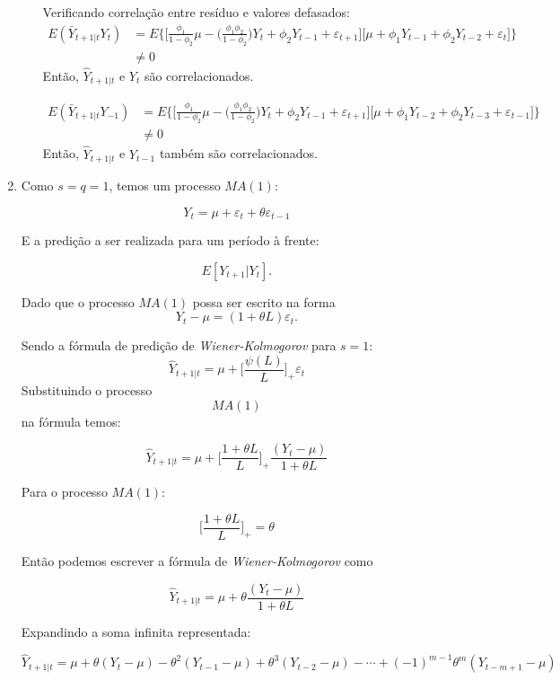 \begin{enumerate}
\begin{enumerate}
	Verificando correlação entre resíduo e valores defasados: \begin{align*}
			E(\bar{Y}_{t+1|t}Y_t)&=E\Bigg\{\Bigg[\frac{\phi_1}{1-\phi_2}\mu-\Bigg(\frac{\phi_1\phi_2}{1-\phi_2}\Bigg)Y_t+\phi_2Y_{t-1}+\varepsilon_{t+1}\Bigg]\Bigg[\mu+\phi_1Y_{t-1}+\phi_2Y_{t-2}+\varepsilon_t\Bigg]\Bigg\}\\
			&\neq0
			\end{align*}
	Então, $\hat{Y}_{t+1|t}$ e $Y_t$ são correlacionados.
	
	\begin{align*}
		E(\bar{Y}_{t+1|t}Y_{-1})&=E\Bigg\{\Bigg[\frac{\phi_1}{1-\phi_2}\mu-\Bigg(\frac{\phi_1\phi_2}{1-\phi_2}\Bigg)Y_t+\phi_2Y_{t-1}+\varepsilon_{t+1}\Bigg]\Bigg[\mu+\phi_1Y_{t-2}+\phi_2Y_{t-3}+\varepsilon_{t-1}\Bigg]\Bigg\}\\
		&\neq0
	\end{align*}
	Então, $\hat{Y}_{t+1|t}$ e $Y_{t-1}$ também são correlacionados.
	
	\end{enumerate}
	
	 
	
	\item[\fbox{4.2}]
		
		Como $s=q=1$, temos um processo $MA(1)$:
		
		$$Y_t=\mu+\varepsilon_t+\theta\varepsilon_{t-1}$$
		
		E a predição a ser realizada para um período à frente:
		
		$$E[Y_{t+1}|Y_t].$$
		
		Dado que o processo $MA(1)$ possa ser escrito na forma 
		$$Y_t-\mu=(1+\theta L)\varepsilon_t.$$
		
		Sendo a fórmula de predição de \emph{Wiener-Kolmogorov} para $s=1$:
		$$\hat{Y}_{t+1|t}=\mu+\Bigg[\frac{\psi(L)}{L}\Bigg]_+\varepsilon_t$$
		Substituindo o processo $$MA(1)$$ na fórmula temos:
		
		$$\hat{Y}_{t+1|t}=\mu+\Bigg[\frac{1+\theta L}{L}\Bigg]_+\frac{(Y_t-\mu)}{1+\theta L}$$
		
		Para o processo $MA(1)$:
		
		$$\Big[\frac{1+\theta L}{L}\Big]_+=\theta$$

		Então podemos escrever a fórmula de \emph{Wiener-Kolmogorov} como
		
		$$\hat{Y}_{t+1|t}=\mu+\theta\frac{(Y_t-\mu)}{1+\theta L}$$
		
		Expandindo a soma infinita representada:
		
		$$\hat{Y}_{t+1|t}=\mu+\theta(Y_t-\mu)-\theta^2(Y_{t-1}-\mu)+\theta^3(Y_{t-2}-\mu)-\cdots+(-1)^{m-1}\theta^{m}(Y_{t-m+1}-\mu)$$
		

\end{enumerate}
